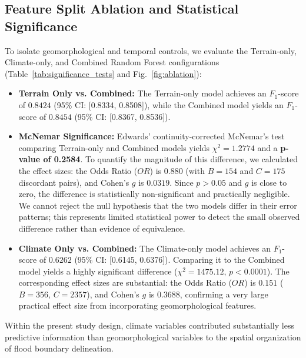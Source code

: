 \documentclass[12pt, a4paper]{article}
\begin{document}
\subsection{Feature Split Ablation and Statistical Significance}
To isolate geomorphological and temporal controls, we evaluate the Terrain-only, Climate-only, and Combined Random Forest configurations (Table~\ref{tab:significance_tests} and Fig.~\ref{fig:ablation}):
\begin{itemize}
    \item \textbf{Terrain Only vs. Combined:} The Terrain-only model achieves an $F_1$-score of $0.8424$ (95\% CI: [0.8334, 0.8508]), while the Combined model yields an $F_1$-score of $0.8454$ (95\% CI: [0.8367, 0.8536]). 
    \item \textbf{McNemar Significance:} Edwards' continuity-corrected McNemar's test comparing Terrain-only and Combined models yields $\chi^2 = 1.2774$ and a \textbf{p-value of 0.2584}. To quantify the magnitude of this difference, we calculated the effect sizes: the Odds Ratio ($OR$) is $0.880$ (with $B=154$ and $C=175$ discordant pairs), and Cohen's $g$ is $0.0319$. Since $p > 0.05$ and $g$ is close to zero, the difference is statistically non-significant and practically negligible. We cannot reject the null hypothesis that the two models differ in their error patterns; this represents limited statistical power to detect the small observed difference rather than evidence of equivalence.
    \item \textbf{Climate Only vs. Combined:} The Climate-only model achieves an $F_1$-score of $0.6262$ (95\% CI: [0.6145, 0.6376]). Comparing it to the Combined model yields a highly significant difference ($\chi^2 = 1475.12$, $p < 0.0001$). The corresponding effect sizes are substantial: the Odds Ratio ($OR$) is $0.151$ ($B=356$, $C=2357$), and Cohen's $g$ is $0.3688$, confirming a very large practical effect size from incorporating geomorphological features.
\end{itemize}
Within the present study design, climate variables contributed substantially less predictive information than geomorphological variables to the spatial organization of flood boundary delineation.
\end{document}
